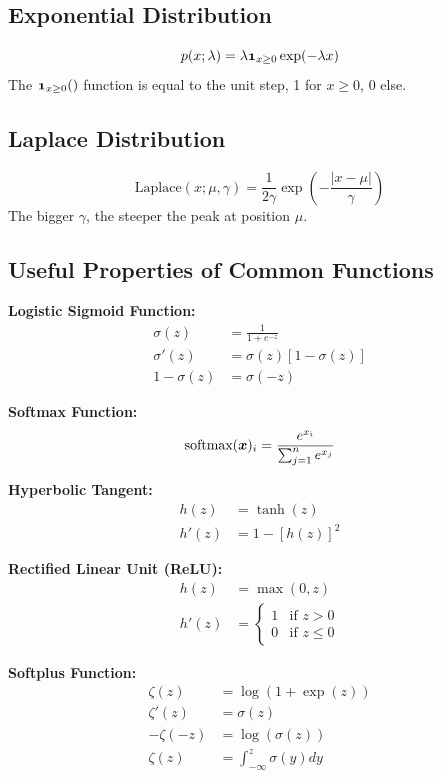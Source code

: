 \begin{multicols}{2}
	\subsection{Exponential Distribution}
	\[ p(x;\lambda) = \lambda \bol{1}_{x\ge 0} \exp(-\lambda x) \]
	The $\bol{1}_{x\ge 0}()$ function is equal to the unit step, 1 for $x\ge 0$, 0 else.

	\subsection{Laplace Distribution}
	\[ \text{Laplace}(x;\mu,\gamma)=\frac{1}{2\gamma}\exp\left( -\frac{\lvert x-\mu \rvert }{\gamma} \right) \]
	The bigger $\gamma$, the steeper the peak at position $\mu$.

	\subsection{Useful Properties of Common Functions}
	\textbf{Logistic Sigmoid Function:}
	\begin{align*}
	\sigma(z) &= \frac{1}{1+e^{-z}}\\
	\sigma'(z)&= \sigma(z)\left[ 1-\sigma(z) \right]\\
	1-\sigma(z) &= \sigma(-z)
	\end{align*}

	\textbf{Softmax Function:}
	\begin{align*}
	\text{softmax}(\bol{x})_i = \frac{e^{x_i}}{\sum_{j=1}^{n}e^{x_j}}
	\end{align*}

	\textbf{Hyperbolic Tangent:}
	\begin{align*}
	h(z) &= \tanh(z)\\
	h'(z)&= 1-\left[h(z)\right]^2
	\end{align*}

	\textbf{Rectified Linear Unit (ReLU):}
	\begin{align*}
	h(z) &= \max\left(0,z\right)\\
	h'(z)&= \begin{cases}
	1 & \text{if } z>0\\
	0 & \text{if } z\le 0
	\end{cases}
	\end{align*}

	\textbf{Softplus Function:}
	\begin{align*}
	\zeta(z) &= \log\left(1+\exp(z)\right)\\
	\zeta'(z)&= \sigma(z)\\
	-\zeta(-z) &= \log\left(\sigma(z)\right)\\
	\zeta(z) &= \int_{-\infty}^{z}\sigma(y)dy
	\end{align*}


\end{multicols}
